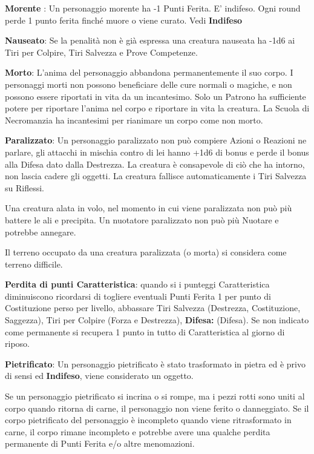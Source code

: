 \begin{multicols}{2}
\textbf{Morente} : Un personaggio morente ha -1 Punti Ferita. E' indifeso. Ogni round perde 1 punto ferita finché muore o viene curato. Vedi \textbf{Indifeso}

\textbf{Nauseato}: Se la penalità non è già espressa una creatura nauseata ha -1d6 ai Tiri per Colpire, Tiri Salvezza e Prove Competenze.

\textbf{Morto}:\hypertarget{morto}{} L'anima del personaggio abbandona permanentemente il suo corpo. I personaggi morti non possono beneficiare delle cure normali o magiche, e non possono essere riportati in vita da un incantesimo. Solo un Patrono ha sufficiente potere per riportare l'anima nel corpo e riportare in vita la creatura. La Scuola di Necromanzia ha incantesimi per rianimare un corpo come non morto.

\textbf{Paralizzato}:  Un personaggio paralizzato non può compiere Azioni o Reazioni ne parlare, gli attacchi in mischia contro di lei hanno +1d6 di bonus e perde il bonus alla Difesa dato dalla Destrezza. La creatura è consapevole di ciò che ha intorno, non lascia cadere gli oggetti. La creatura fallisce automaticamente i Tiri Salvezza su Riflessi.

Una creatura alata in volo, nel momento in cui viene paralizzata non può più battere le ali e precipita. Un nuotatore paralizzato non può più Nuotare e potrebbe annegare.

Il terreno occupato da una creatura paralizzata (o morta) si considera come terreno difficile.

\textbf{Perdita di punti Caratteristica}: quando si i punteggi Caratteristica diminuiscono ricordarsi di togliere eventuali Punti Ferita 1 per punto di Costituzione perso per livello, abbassare Tiri Salvezza (Destrezza, Costituzione, Saggezza), Tiri per Colpire (Forza e Destrezza), \textbf{Difesa:} (Difesa). Se non indicato come permanente si recupera 1 punto in tutto di Caratteristica al giorno di riposo.

\textbf{Pietrificato}: Un personaggio pietrificato è stato trasformato in pietra ed è privo di sensi ed \textbf{Indifeso}, viene considerato un oggetto.

Se un personaggio pietrificato si incrina o si rompe, ma i pezzi rotti sono uniti al corpo quando ritorna di carne, il personaggio non viene ferito o danneggiato. Se il corpo pietrificato del personaggio è incompleto quando viene ritrasformato in carne, il corpo rimane incompleto e potrebbe avere una qualche perdita permanente di Punti Ferita e/o altre menomazioni.


\end{multicols}
